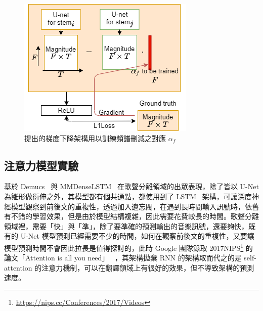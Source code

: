 \begin{figure}[htbp]
    \hfil
    \begin{minipage}[t]{0.45\textwidth}
        \includegraphics[width=\textwidth]{./figures/chapter04_experiment/spectrogram_subtraction_gradientdecent_method.png}
        \caption {提出的梯度下降架構用以訓練頻譜刪減之對應 $\alpha_f$}
        \label{spectrogram_subtraction_NNmethod1}
    \end{minipage}
    \hfil
\end{figure}

\subsection{注意力模型實驗}
基於 Demucs~\cite{defossez2019music} 與 MMDenseLSTM~\cite{takahashi2018mmdenselstm} 在歌聲分離領域的出眾表現，除了皆以 U-Net 為雛形做衍伸之外，其模型都有個共通點，都使用到了 LSTM~\cite{gers1999learning} 架構，可讓深度神經模型觀察到前後文的重複性，透過加入遺忘閥，在遇到長時間輸入訊號時，依舊有不錯的學習效果，但是由於模型結構複雜，因此需要花費較長的時間。歌聲分離領域裡，需要「快」與「準」，除了要準確的預測輸出的音樂訊號，還要夠快，既有的 U-Net 模型預測已經需要不少的時間，如何在觀察前後文的重複性，又要讓模型預測時間不會因此拉長是值得探討的，此時 Google 團隊錄取 2017NIPS\footnote{\url{https://nips.cc/Conferences/2017/Videos}} 的論文「Attention is all you need」~\cite{vaswani2017attention} ，其架構拋棄 RNN 的架構取而代之的是 self-attention 的注意力機制，可以在翻譯領域上有很好的效果，但不導致架構的預測速度。

